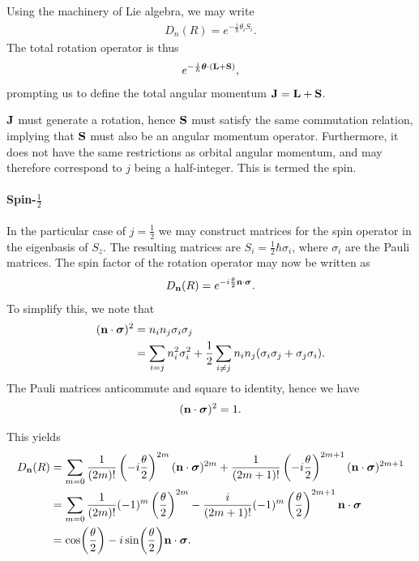 Using the machinery of Lie algebra, we may write
\begin{align*}
	D_{n}(R) = e^{-\frac{i}{\hbar}\theta_{i}S_{i}}.
\end{align*}
The total rotation operator is thus
\begin{align*}
	e^{-\frac{i}{\hbar}\vb*{\theta}\cdot(\vb{L} + \vb{S})},
\end{align*}
prompting us to define the total angular momentum $\vb{J} = \vb{L} + \vb{S}$.

$\vb{J}$ must generate a rotation, hence $\vb{S}$ must satisfy the same commutation relation, implying that $\vb{S}$ must also be an angular momentum operator. Furthermore, it does not have the same restrictions as orbital angular momentum, and may therefore correspond to $j$ being a half-integer. This is termed the spin.

\paragraph{Spin-$\frac{1}{2}$}
In the particular case of $j = \frac{1}{2}$ we may construct matrices for the spin operator in the eigenbasis of $S_{z}$. The resulting matrices are $S_{i} = \frac{1}{2}\hbar\sigma_{i}$, where $\sigma_{i}$ are the Pauli matrices. The spin factor of the rotation operator may now be written as
\begin{align*}
	D_{\vb{n}}(R) = e^{-i\frac{\theta}{2}\vb{n}\cdot\vb*{\sigma}}.
\end{align*}
To simplify this, we note that
\begin{align*}
(\vb{n}\cdot\vb*{\sigma})^{2} &= n_{i}n_{j}\sigma_{i}\sigma_{j} \\
                              &= \sum\limits_{i = j}n_{i}^{2}\sigma_{i}^{2} + \frac{1}{2}\sum\limits_{i\neq j}n_{i}n_{j}(\sigma_{i}\sigma_{j} + \sigma_{j}\sigma_{i}).
\end{align*}
The Pauli matrices anticommute and square to identity, hence we have
\begin{align*}
	(\vb{n}\cdot\vb*{\sigma})^{2} = 1.
\end{align*}

This yields
\begin{align*}
	D_{\vb{n}}(R) &= \sum\limits_{m = 0}\frac{1}{(2m)!}\left(-i\frac{\theta}{2}\right)^{2m}(\vb{n}\cdot\vb*{\sigma})^{2m} + \frac{1}{(2m + 1)!}\left(-i\frac{\theta}{2}\right)^{2m + 1}(\vb{n}\cdot\vb*{\sigma})^{2m + 1} \\
	              &= \sum\limits_{m = 0}\frac{1}{(2m)!}(-1)^{m}\left(\frac{\theta}{2}\right)^{2m} - \frac{i}{(2m + 1)!}(-1)^{m}\left(\frac{\theta}{2}\right)^{2m + 1}\vb{n}\cdot\vb*{\sigma} \\
	              &= \cos(\frac{\theta}{2}) - i\sin(\frac{\theta}{2})\vb{n}\cdot\vb*{\sigma}.
\end{align*}

